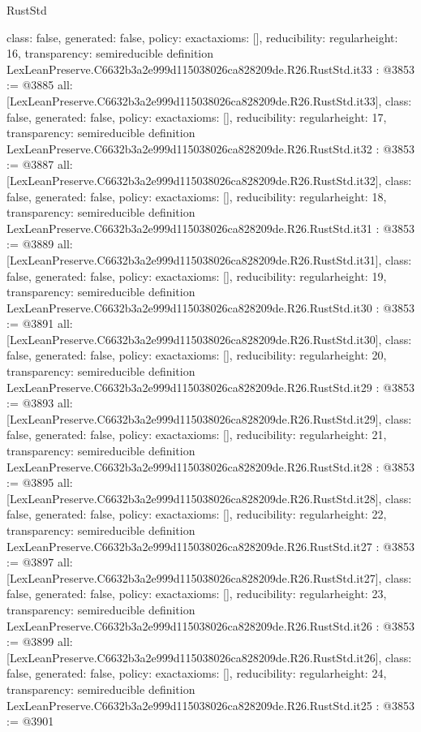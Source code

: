 \begin{lexlean}{RustStd}
\begin{coremodule}
{  class: false,
  generated: false,
  policy: exact{axioms: []},
  reducibility: regular{height: 16},
  transparency: semireducible
}
definition LexLeanPreserve.C6632b3a2e999d115038026ca828209de.R26.RustStd.it33 : @3853 := @3885 {
  all: [LexLeanPreserve.C6632b3a2e999d115038026ca828209de.R26.RustStd.it33],
  class: false,
  generated: false,
  policy: exact{axioms: []},
  reducibility: regular{height: 17},
  transparency: semireducible
}
definition LexLeanPreserve.C6632b3a2e999d115038026ca828209de.R26.RustStd.it32 : @3853 := @3887 {
  all: [LexLeanPreserve.C6632b3a2e999d115038026ca828209de.R26.RustStd.it32],
  class: false,
  generated: false,
  policy: exact{axioms: []},
  reducibility: regular{height: 18},
  transparency: semireducible
}
definition LexLeanPreserve.C6632b3a2e999d115038026ca828209de.R26.RustStd.it31 : @3853 := @3889 {
  all: [LexLeanPreserve.C6632b3a2e999d115038026ca828209de.R26.RustStd.it31],
  class: false,
  generated: false,
  policy: exact{axioms: []},
  reducibility: regular{height: 19},
  transparency: semireducible
}
definition LexLeanPreserve.C6632b3a2e999d115038026ca828209de.R26.RustStd.it30 : @3853 := @3891 {
  all: [LexLeanPreserve.C6632b3a2e999d115038026ca828209de.R26.RustStd.it30],
  class: false,
  generated: false,
  policy: exact{axioms: []},
  reducibility: regular{height: 20},
  transparency: semireducible
}
definition LexLeanPreserve.C6632b3a2e999d115038026ca828209de.R26.RustStd.it29 : @3853 := @3893 {
  all: [LexLeanPreserve.C6632b3a2e999d115038026ca828209de.R26.RustStd.it29],
  class: false,
  generated: false,
  policy: exact{axioms: []},
  reducibility: regular{height: 21},
  transparency: semireducible
}
definition LexLeanPreserve.C6632b3a2e999d115038026ca828209de.R26.RustStd.it28 : @3853 := @3895 {
  all: [LexLeanPreserve.C6632b3a2e999d115038026ca828209de.R26.RustStd.it28],
  class: false,
  generated: false,
  policy: exact{axioms: []},
  reducibility: regular{height: 22},
  transparency: semireducible
}
definition LexLeanPreserve.C6632b3a2e999d115038026ca828209de.R26.RustStd.it27 : @3853 := @3897 {
  all: [LexLeanPreserve.C6632b3a2e999d115038026ca828209de.R26.RustStd.it27],
  class: false,
  generated: false,
  policy: exact{axioms: []},
  reducibility: regular{height: 23},
  transparency: semireducible
}
definition LexLeanPreserve.C6632b3a2e999d115038026ca828209de.R26.RustStd.it26 : @3853 := @3899 {
  all: [LexLeanPreserve.C6632b3a2e999d115038026ca828209de.R26.RustStd.it26],
  class: false,
  generated: false,
  policy: exact{axioms: []},
  reducibility: regular{height: 24},
  transparency: semireducible
}
definition LexLeanPreserve.C6632b3a2e999d115038026ca828209de.R26.RustStd.it25 : @3853 := @3901 {
}
\end{coremodule}
\end{lexlean}
